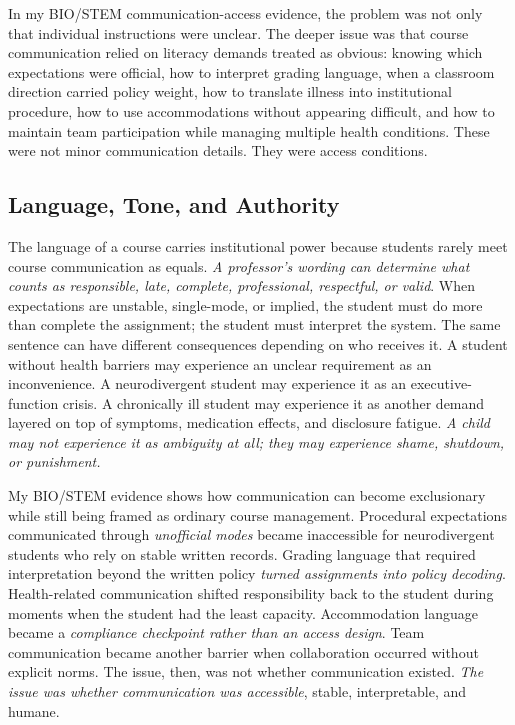 \documentclass[11pt]{article}
\begin{document}
In my BIO/STEM communication-access evidence, the problem was not only that individual instructions were unclear. The deeper issue was that course communication relied on literacy demands treated as obvious: knowing which expectations were official, how to interpret grading language, when a classroom direction carried policy weight, how to translate illness into institutional procedure, how to use accommodations without appearing difficult, and how to maintain team participation while managing multiple health conditions. These were not minor communication details. They were access conditions.

\subsection*{Language, Tone, and Authority}

The language of a course carries institutional power because students rarely meet course communication as equals. \textit{A professor's wording can determine what counts as responsible, late, complete, professional, respectful, or valid}. When expectations are unstable, single-mode, or implied, the student must do more than complete the assignment; the student must interpret the system. The same sentence can have different consequences depending on who receives it. A student without health barriers may experience an unclear requirement as an inconvenience. A neurodivergent student may experience it as an executive-function crisis. A chronically ill student may experience it as another demand layered on top of symptoms, medication effects, and disclosure fatigue. \textit{A child may not experience it as ambiguity at all; they may experience shame, shutdown, or punishment.}

My BIO/STEM evidence shows how communication can become exclusionary while still being framed as ordinary course management. Procedural expectations communicated through \textit{unofficial modes} became inaccessible for neurodivergent students who rely on stable written records. Grading language that required interpretation beyond the written policy \textit{turned assignments into policy decoding}. Health-related communication shifted responsibility back to the student during moments when the student had the least capacity. Accommodation language became a \textit{compliance checkpoint rather than an access design}. Team communication became another barrier when collaboration occurred without explicit norms. The issue, then, was not whether communication existed. \textit{The issue was whether communication was accessible}, stable, interpretable, and humane.
\end{document}
